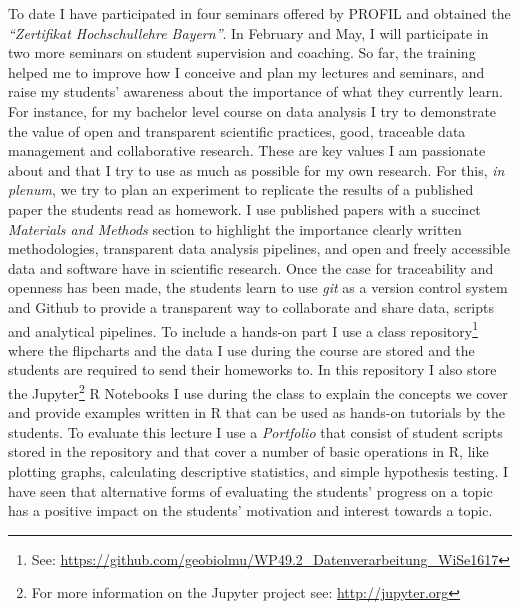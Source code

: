 \documentclass[a4paper,11pt]{article}
\begin{document}
To date I have participated in four seminars offered by PROFIL and obtained the \emph{``Zertifikat Hochschul\-lehre Bayern''}. In February and May, I will participate in two more seminars on student supervision and coaching. So far, the training helped me to improve how I conceive and plan my lectures and seminars, and raise my students' awareness about the importance of what they currently learn. For instance, for my bachelor level course on data analysis I try to demonstrate the value of open and transparent scientific practices, good, traceable data management and collaborative research. These are key values I am passionate about and that I try to use as much as possible for my own research. For this, \emph{in plenum}, we try to plan an experiment to replicate the results of a published paper the students read as homework. I use published papers with a succinct \emph{Materials and Methods} section to highlight the importance clearly written methodologies, transparent data analysis pipelines, and open and freely accessible data and software have in scientific research. Once the case for traceability and openness has been made, the students learn to use \emph{git} as a version control system and Github to provide a transparent way to collaborate and share data, scripts and analytical pipelines. To include a hands-on part I use a class repository\footnote{See: \href{https://github.com/geobiolmu/WP49.2_Datenverarbeitung_WiSe1617}{https://github.com/geobiolmu/WP49.2\_Datenverarbeitung\_WiSe1617}} where the flipcharts and the data I use during the course are stored and the students are required to send their homeworks to. In this repository I also store the Jupyter\footnote{For more information on the Jupyter project see: \href{http://jupyter.org}{http://jupyter.org}} R Notebooks I use during the class to explain the concepts we cover and provide examples written in R that can be used as hands-on tutorials by the students. To evaluate this lecture I use a \emph{Portfolio} that consist of student scripts stored in the repository and that cover a number of basic operations in R, like plotting graphs, calculating descriptive statistics, and simple hypothesis testing. I have seen that alternative forms of evaluating the students' progress on a topic has a positive impact on the students' motivation and interest towards a topic.\\
\end{document}
